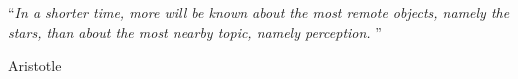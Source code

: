 \clearpage
\thispagestyle{empty}
\vspace*{0.2\textheight}

\noindent\enquote{\itshape In a shorter time, more will be known about the most remote objects, namely the stars, than about the most nearby topic, namely perception. }\bigbreak

\hfill Aristotle
\clearpage